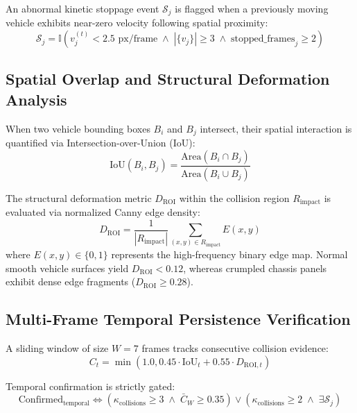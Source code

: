 \documentclass[conference]{IEEEtran}
\begin{document}
An abnormal kinetic stoppage event $\mathcal{S}_j$ is flagged when a previously moving vehicle exhibits near-zero velocity following spatial proximity:
\begin{equation}
    \mathcal{S}_j = \mathbb{I}\left(v_j^{(t)} < 2.5\text{ px/frame} \;\land\; |\{v_j\}| \ge 3 \;\land\; \text{stopped\_frames}_j \ge 2\right)
\end{equation}

\subsection{Spatial Overlap and Structural Deformation Analysis}
When two vehicle bounding boxes $B_i$ and $B_j$ intersect, their spatial interaction is quantified via Intersection-over-Union ($\text{IoU}$):
\begin{equation}
    \text{IoU}(B_i, B_j) = \frac{\text{Area}(B_i \cap B_j)}{\text{Area}(B_i \cup B_j)}
\end{equation}

The structural deformation metric $D_{\text{ROI}}$ within the collision region $R_{\text{impact}}$ is evaluated via normalized Canny edge density:
\begin{equation}
    D_{\text{ROI}} = \frac{1}{|R_{\text{impact}}|} \sum_{(x,y) \in R_{\text{impact}}} E(x, y)
\end{equation}
where $E(x, y) \in \{0, 1\}$ represents the high-frequency binary edge map. Normal smooth vehicle surfaces yield $D_{\text{ROI}} < 0.12$, whereas crumpled chassis panels exhibit dense edge fragments ($D_{\text{ROI}} \ge 0.28$).

\subsection{Multi-Frame Temporal Persistence Verification}
A sliding window of size $W = 7$ frames tracks consecutive collision evidence:
\begin{equation}
    C_t = \min\left(1.0, 0.45 \cdot \text{IoU}_t + 0.55 \cdot D_{\text{ROI}, t}\right)
\end{equation}

Temporal confirmation is strictly gated:
\begin{equation}
    \text{Confirmed}_{\text{temporal}} \iff \left(\kappa_{\text{collisions}} \ge 3 \;\land\; \bar{C}_W \ge 0.35\right) \lor \left(\kappa_{\text{collisions}} \ge 2 \;\land\; \exists \mathcal{S}_j\right)
\end{equation}
\end{document}

